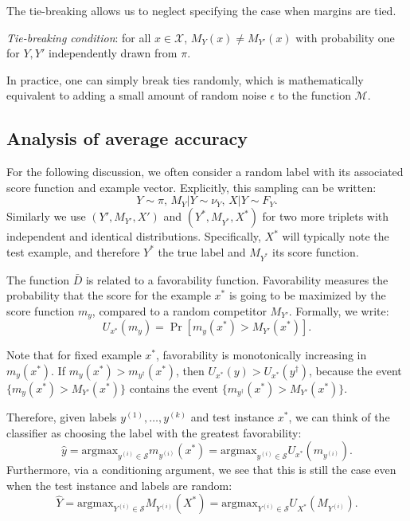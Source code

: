 \documentclass[twoside,11pt]{article}
\newcommand{\argmax}{\text{argmax}}
\begin{document}
The tie-breaking allows us
to neglect specifying the case when
margins are tied.
\begin{definition}
\emph{Tie-breaking condition}: for all $x \in \mathcal{X}$,
$M_Y(x) \neq M_{Y'}(x)$
with probability one for $Y, Y'$ independently drawn from $\pi$.
\end{definition}
In practice, one can simply break ties randomly,
which is mathematically equivalent to adding a small amount of random
noise $\epsilon$ to the function $\mathcal{M}$.

\subsection{Analysis of average accuracy}

For the following discussion, we often consider a random label with its associated score function and example vector. Explicitly, this sampling can be written:
\[Y \sim \pi,\, M_{Y}|Y \sim \nu_{Y},\, X|Y \sim F_{Y}. \]
Similarly we use $(Y',M_{Y'},X')$ and $(Y^*,M_{Y^*},X^*)$ for two more triplets with independent and identical distributions. Specifically, $X^*$ will typically note the test example, and therefore $Y^*$ the true label and $M_{Y^*}$ its score function. 

The function $\bar{D}$ is related to a favorability function. Favorability measures the probability that the score for 
the example $x^*$ is going to be maximized by the score function $m_y$, compared to a random competitor $M_{Y'}$. 
Formally, we write:
\begin{equation}\label{eq:U_function}
U_{x^*}(m_{y}) = \Pr[m_{y}(x^*) > M_{Y'}(x^*)].
\end{equation}

Note that for fixed example $x^*$, favorability is monotonically increasing in $m_{y}(x^*)$.  If $m_y(x^*) > m_{y^\dagger}(x^*)$, then $U_{x^*}(y) > U_{x^*}(y^\dagger)$, because the event $\{m_{y}(x^*) > M_{Y'}(x^*)\}$ contains the event $\{m_{y^\dagger}(x^*) > M_{Y'}(x^*)\}$.

Therefore, given labels $y^{(1)},\hdots,y^{(k)}$ and test instance $x^*$,
we can think of the classifier as choosing the label with the greatest favorability:
\[
\hat{y} = \argmax_{y^{(i)} \in \mathcal{S}} m_{y^{(i)}}(x^*) = \argmax_{y^{(i)} \in \mathcal{S}} U_{x^*}(m_{y^{(i)}}).
\]
Furthermore, via a conditioning argument, we see that this is still the case even when the test instance and labels are random:
\[
\hat{Y} = \argmax_{Y^{(i)} \in \mathcal{S}} M_{Y^{(i)}}(X^*) = \argmax_{Y^{(i)} \in \mathcal{S}} U_{X^*}(M_{Y^{(i)}}).
\]
\end{document}
